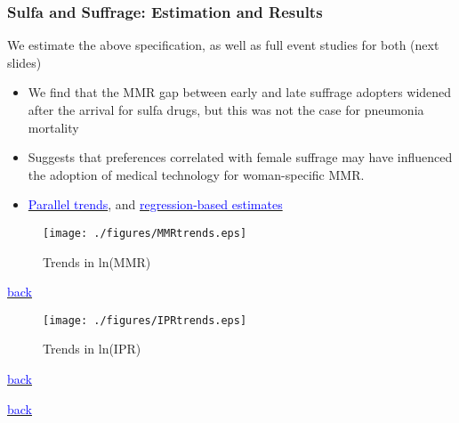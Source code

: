 \documentclass[9pt,letterpaper,subeqn]{beamer}
\begin{document}
\begin{frame}[label=USA]
\frametitle{Sulfa and Suffrage: Estimation and Results}
We estimate the above specification, as well as full event studies for both 
(next slides)
\vspace{5mm}
\begin{itemize}
\setlength{\itemsep}{15pt}
  \item We find that the MMR gap between early and late suffrage adopters widened 
        after the arrival for sulfa drugs, but this was not the case for 
        pneumonia mortality
  \item Suggests that preferences correlated with female suffrage may have 
        influenced the adoption of medical technology for woman-specific MMR.
  \item \hyperlink{ptrends}{\textcolor{blue}{Parallel trends}}, and 
        \hyperlink{DDreg}{\textcolor{blue}{regression-based estimates}}
\end{itemize}
\end{frame}

\begin{frame}[plain,label=ptrends]
\begin{figure}[h!]
\centering
\caption{Trends in ln(MMR)}
\texttt{[image: ./figures/MMRtrends.eps]}
\end{figure}
{\footnotesize \hyperlink{USA}{\textcolor{blue}{back}}}
\end{frame}

\begin{frame}[plain,label=ptrends]
\begin{figure}[h!]
\centering
\caption{Trends in ln(IPR)}
\texttt{[image: ./figures/IPRtrends.eps]}
\end{figure}
{\footnotesize \hyperlink{USA}{\textcolor{blue}{back}}}
\end{frame}

\begin{frame}[plain,label=DDreg]

{\footnotesize \hyperlink{USA}{\textcolor{blue}{back}}}
\end{frame}
\end{document}
